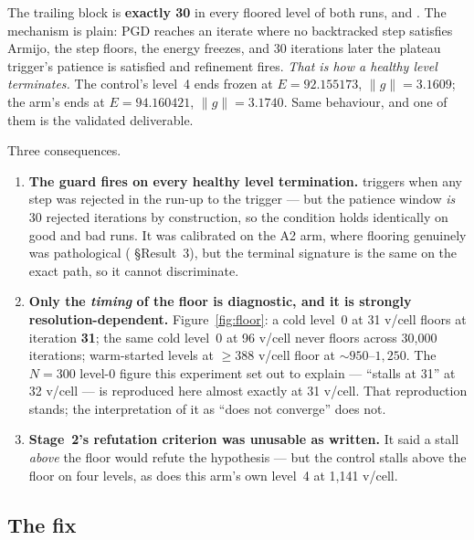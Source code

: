 \documentclass[11pt,a4paper]{article}
\begin{document}
The trailing block is \textbf{exactly 30} in every floored level of both runs,
and . The mechanism is plain: PGD reaches an iterate
where no backtracked step satisfies Armijo, the step floors, the energy freezes,
and 30 iterations later the plateau trigger's patience is satisfied and
refinement fires. \emph{That is how a healthy level terminates.} The control's
level~4 ends frozen at \(E{=}92.155173\), \(\|g\|{=}3.1609\); the arm's ends at
\(E{=}94.160421\), \(\|g\|{=}3.1740\). Same behaviour, and one of them is the
validated deliverable.

Three consequences.

\begin{enumerate}
  \item \textbf{The guard fires on every healthy level termination.}
     triggers when any step was rejected in the run-up
    to the trigger --- but the patience window \emph{is} 30 rejected iterations by
    construction, so the condition holds identically on good and bad runs. It was
    calibrated on the A2 arm, where flooring genuinely was pathological
    ( \S Result~3), but the
    terminal signature is the same on the exact path, so it cannot discriminate.
  \item \textbf{Only the \emph{timing} of the floor is diagnostic, and it is
    strongly resolution-dependent.} Figure~\ref{fig:floor}: a cold level~0 at
    31 v/cell floors at iteration \textbf{31}; the same cold level~0 at
    96 v/cell never floors across 30{,}000 iterations; warm-started levels at
    \(\geq\!388\) v/cell floor at \(\sim\!950\text{--}1{,}250\). The
    \(N{=}300\) level-0 figure this experiment set out to explain --- ``stalls
    at 31'' at 32 v/cell --- is reproduced here almost exactly at 31 v/cell.
    That reproduction stands; the interpretation of it as ``does not converge''
    does not.
  \item \textbf{Stage~2's refutation criterion was unusable as written.} It said
    a stall \emph{above} the floor would refute the hypothesis --- but the control
    stalls above the floor on four levels, as does this arm's own level~4 at
    1{,}141 v/cell.
\end{enumerate}

\subsection{The fix}
\label{sec:stall-fix}
\end{document}
